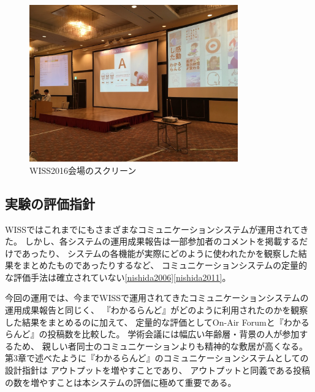 \begin{figure}[h]
\centering
\includegraphics[width=9cm]{images/wiss2016.png}
\caption{WISS2016会場のスクリーン}
\label{wiss2016}
\end{figure}


\subsection{実験の評価指針}
WISSではこれまでにもさまざまなコミュニケーションシステムが運用されてきた。
しかし、各システムの運用成果報告は一部参加者のコメントを掲載するだけであったり、
システムの各機能が実際にどのように使われたかを観察した結果をまとめたものであったりするなど、
コミュニケーションシステムの定量的な評価手法は確立されていない\ref{nishida2006}\ref{nishida2011}。

今回の運用では、今までWISSで運用されてきたコミュニケーションシステムの運用成果報告と同じく、
『わかるらんど』がどのように利用されたのかを観察した結果をまとめるのに加えて、
定量的な評価としてOn-Air Forumと『わかるらんど』の投稿数を比較した。
学術会議には幅広い年齢層・背景の人が参加するため、
親しい者同士のコミュニケーションよりも精神的な敷居が高くなる。
第3章で述べたように『わかるらんど』のコミュニケーションシステムとしての設計指針は
アウトプットを増やすことであり、
アウトプットと同義である投稿の数を増やすことは本システムの評価に極めて重要である。